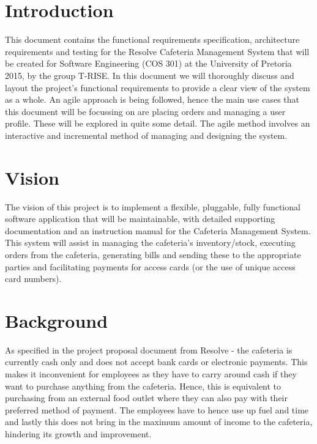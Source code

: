 \documentclass[12pt]{article}
\begin{document}
\maketitle
\break

\tableofcontents
\break


\section{Introduction}
This document contains the functional requirements specification, architecture requirements and testing for the Resolve Cafeteria Management System that will be created for Software Engineering (COS 301) at the University of Pretoria 2015, by the group T-RISE. In this document we will thoroughly discuss and layout the project's functional requirements to provide a clear view of the system as a whole. An agile approach is being followed, hence the main use cases that this document will be focussing on are placing orders and managing a user profile. These will be explored in quite some detail.  The agile method involves an interactive and incremental method of managing and designing the system. 
\section{Vision}
The vision of this project is to implement a flexible, pluggable, fully functional software application that will be maintainable, with detailed supporting documentation and an instruction manual for the Cafeteria Management System. This system will assist in managing the cafeteria's inventory/stock, executing orders from the cafeteria, generating bills and sending these to the appropriate parties and facilitating payments for access cards (or the use of unique access card numbers). 

\section{Background}
As specified in the project proposal document from Resolve - the cafeteria is currently cash only and does not accept bank cards or electronic payments. This makes it inconvenient for employees as they have to carry around cash if they want to purchase anything from the cafeteria. Hence, this is equivalent to purchasing from an external food outlet where they can also pay with their preferred method of payment. The employees have to hence use up fuel and time and lastly this does not bring in the maximum amount of income to the cafeteria, hindering its growth and improvement.\\
\end{document}
